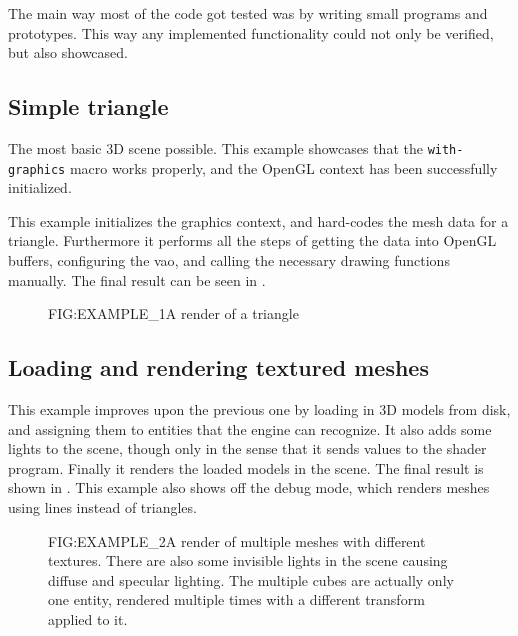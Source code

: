 
The main way most of the code got tested was by writing small programs and prototypes.
This way any implemented functionality could not only be verified,
but also showcased.

\subsection{Simple triangle}

The most basic 3D scene possible.
This example showcases that the \texttt{with-graphics} macro works properly,
and the OpenGL context has been successfully initialized.

This example initializes the graphics context,
and hard-codes the mesh data for a triangle.
Furthermore it performs all the steps of getting the data into OpenGL buffers,
configuring the \ac{vao},
and calling the necessary drawing functions manually.
The final result can be seen in .

\begin{figure}[Exploratory tests \textemdash Triangle]{FIG:EXAMPLE_1}{A render of a triangle}
\end{figure}

\subsection{Loading and rendering textured meshes}

This example improves upon the previous one by loading in 3D models from disk,
and assigning them to entities that the engine can recognize.
It also adds some lights to the scene,
though only in the sense that it sends values to the shader program.
Finally it renders the loaded models in the scene.
The final result is shown in .
This example also shows off the debug mode,
which renders meshes using lines instead of triangles.

\begin{figure}[Exploratory tests \textemdash Meshes]{FIG:EXAMPLE_2}{A render of multiple meshes with different textures. There are also some invisible lights in the scene causing diffuse and specular lighting. The multiple cubes are actually only one entity, rendered multiple times with a different transform applied to it.}
\end{figure}

